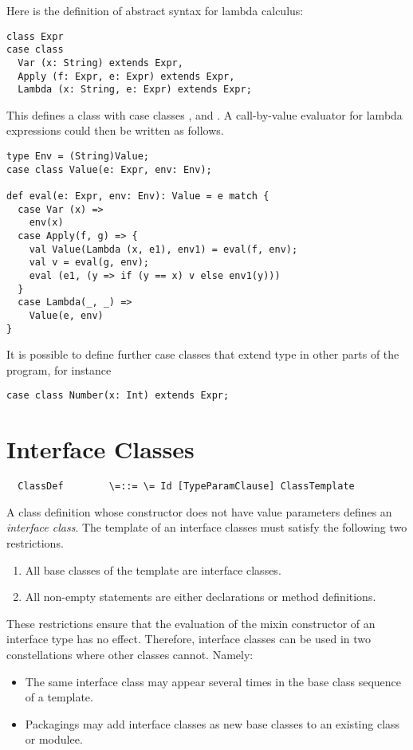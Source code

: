 \documentclass[11pt]{report}
\begin{document}
\begin{itemize}
\example Here is the definition of abstract syntax for lambda
calculus:

\begin{verbatim}
class Expr
case class
  Var (x: String) extends Expr,
  Apply (f: Expr, e: Expr) extends Expr,
  Lambda (x: String, e: Expr) extends Expr;
\end{verbatim}
This defines a class \verb@Expr@ with case classes
\verb@Var@, \verb@Apply@ and \verb@Lambda@. A call-by-value evaluator for lambda
expressions could then be written as follows.

\begin{verbatim}
type Env = (String)Value;
case class Value(e: Expr, env: Env);

def eval(e: Expr, env: Env): Value = e match {
  case Var (x) =>
    env(x)
  case Apply(f, g) => {
    val Value(Lambda (x, e1), env1) = eval(f, env);
    val v = eval(g, env);
    eval (e1, (y => if (y == x) v else env1(y)))
  }
  case Lambda(_, _) =>
    Value(e, env)
}
\end{verbatim}

It is possible to define further case classes that extend type
\verb@Expr@ in other parts of the program, for instance
\begin{verbatim}
case class Number(x: Int) extends Expr;
\end{verbatim}

\section{Interface Classes}

\label{sec:interfaces}

\syntax\begin{verbatim}
  ClassDef        \=::= \= Id [TypeParamClause] ClassTemplate
\end{verbatim}

A class definition whose constructor does not have value parameters
defines an {\em interface class}. The template of an interface classes
must satisfy the following two restrictions.
\begin{enumerate}
\item All base classes of the template are interface classes.
\item All non-empty statements are either declarations or method definitions.
\end{enumerate}
These restrictions ensure that the evaluation of the mixin constructor
of an interface type has no effect. Therefore, interface classes can be
used in two constellations where other classes cannot. Namely:
\begin{itemize}
\item The same interface class may appear several times in the base class
sequence of a template.
\item Packagings may add interface classes as new base classes to an
existing class or modulee.
\end{itemize}


\end{itemize}
\end{document}
